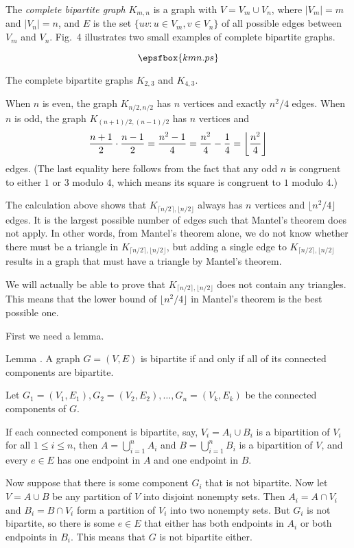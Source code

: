The {\it complete bipartite graph} $K_{m,n}$ is a graph with $V = V_m \cup V_n$, where
$|V_m|=m$ and $|V_n| = n$, and $E$ is the set $\{uv : u\in V_m, v\in V_n\}$ of
all possible edges between $V_m$ and $V_n$. Fig.~4 illustrates two small examples
of complete bipartite graphs.

\midinsert
$$\epsfbox{kmn.ps}$$
\vskip5pt
\caption{The complete bipartite graphs $K_{2,3}$ and $K_{4,3}$.}
\endinsert
\goodbreak
When $n$ is even, the graph $K_{n/2,n/2}$ has $n$ vertices and exactly $n^2/4$ edges.
When $n$ is odd, the graph $K_{(n+1)/2, (n-1)/2}$ has $n$ vertices and
$$ {n+1\over 2} \cdot {n-1\over 2} = {n^2-1\over 4} = {n^2\over 4}-{1\over 4}
= \biggl\lfloor {n^2\over 4} \biggr\rfloor$$
edges. (The last equality here follows from the fact that any odd $n$ is congruent to either $1$ or
$3$ modulo $4$, which means its square is congruent to $1$ modulo $4$.)

The calculation above shows that $K_{\lceil n/2 \rceil, \lfloor n/2 \rfloor}$
always has $n$ vertices and $\lfloor n^2/4\rfloor$ edges. It is the largest possible number
of edges such that Mantel's theorem does not apply. In other words, from Mantel's theorem alone,
we do not know whether
there must be a triangle in $K_{\lceil n/2 \rceil, \lfloor n/2 \rfloor}$, but adding
a single edge to $K_{\lceil n/2 \rceil, \lfloor n/2 \rfloor}$ results in a graph that must
have a triangle by Mantel's theorem.

We will actually be able to prove that $K_{\lceil n/2 \rceil, \lfloor n/2 \rfloor}$ does not
contain any triangles. This means that the lower bound of $\lfloor n^2/4\rfloor$ in Mantel's theorem
is the best possible one.

First we need a lemma.

\proclaim{} Lemma \advthm.
A graph $G=(V,E)$ is bipartite if and only if all of its connected components
are bipartite.

\proof Let $G_1 = (V_1, E_1), G_2 = (V_2,E_2),\ldots, G_n = (V_k, E_k)$ be the
connected components of $G$.

If each connected component is bipartite, say,
$V_i = A_i\cup B_i$ is a bipartition of $V_i$ for all $1\le i\le n$, then
$A = \bigcup_{i=1}^n A_i$ and $B = \bigcup_{i=1}^n B_i$ is a bipartition of $V$,
and every $e\in E$ has one endpoint in $A$ and one endpoint in $B$.

Now suppose that there is some component $G_i$ that is not bipartite.
Now let $V = A\cup B$
be any partition of $V$ into disjoint nonempty sets. Then $A_i = A\cap V_i$
and $B_i = B\cap V_i$ form a partition of $V_i$
into two nonempty sets. But $G_i$ is not bipartite, so there is some $e\in E$
that either has both endpoints in $A_i$ or both endpoints in $B_i$. This means
that $G$ is not bipartite either.\slug

